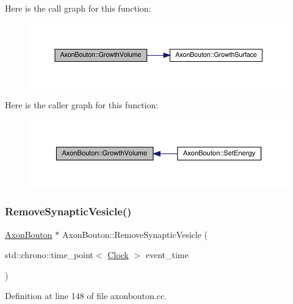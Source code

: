 Here is the call graph for this function\+:
\nopagebreak
\begin{figure}[H]
\begin{center}
\leavevmode
\includegraphics[width=350pt]{class_axon_bouton_a10ac4446e777376a3944c87b2bcf26b5_cgraph}
\end{center}
\end{figure}
Here is the caller graph for this function\+:
\nopagebreak
\begin{figure}[H]
\begin{center}
\leavevmode
\includegraphics[width=350pt]{class_axon_bouton_a10ac4446e777376a3944c87b2bcf26b5_icgraph}
\end{center}
\end{figure}
\mbox{\label{class_axon_bouton_a1f0b13fa7ec408c9e0cfb22cea9bbe8c}} 
\subsubsection{\texorpdfstring{Remove\+Synaptic\+Vesicle()}{RemoveSynapticVesicle()}}
{\footnotesize\ttfamily \hyperlink{class_axon_bouton}{Axon\+Bouton} $\ast$ Axon\+Bouton\+::\+Remove\+Synaptic\+Vesicle (\begin{DoxyParamCaption}\item[{std\+::chrono\+::time\+\_\+point$<$ \hyperlink{universe_8h_a0ef8d951d1ca5ab3cfaf7ab4c7a6fd80}{Clock} $>$}]{event\+\_\+time }\end{DoxyParamCaption})}



Definition at line 148 of file axonbouton.\+cc.

